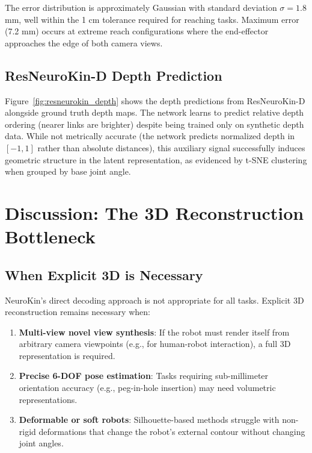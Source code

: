 \documentclass[12pt,a4paper,oneside]{report}
\begin{document}
The error distribution is approximately Gaussian with standard deviation $\sigma = 1.8$ mm, well within the 1 cm tolerance required for reaching tasks. Maximum error (7.2 mm) occurs at extreme reach configurations where the end-effector approaches the edge of both camera views.

\subsection{ResNeuroKin-D Depth Prediction}

Figure~\ref{fig:resneurokin_depth} shows the depth predictions from ResNeuroKin-D alongside ground truth depth maps. The network learns to predict relative depth ordering (nearer links are brighter) despite being trained only on synthetic depth data. While not metrically accurate (the network predicts normalized depth in $[-1, 1]$ rather than absolute distances), this auxiliary signal successfully induces geometric structure in the latent representation, as evidenced by t-SNE clustering when grouped by base joint angle.

\section{Discussion: The 3D Reconstruction Bottleneck}

\subsection{When Explicit 3D is Necessary}

NeuroKin's direct decoding approach is not appropriate for all tasks. Explicit 3D reconstruction remains necessary when:

\begin{enumerate}
    \item \textbf{Multi-view novel view synthesis}: If the robot must render itself from arbitrary camera viewpoints (e.g., for human-robot interaction), a full 3D representation is required.
    \item \textbf{Precise 6-DOF pose estimation}: Tasks requiring sub-millimeter orientation accuracy (e.g., peg-in-hole insertion) may need volumetric representations.
    \item \textbf{Deformable or soft robots}: Silhouette-based methods struggle with non-rigid deformations that change the robot's external contour without changing joint angles.
\end{enumerate}
\end{document}
